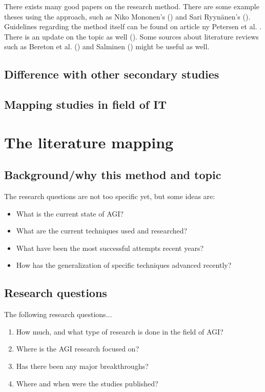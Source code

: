 \documentclass[utf8,english]{gradu3}
\begin{document}
There exists many good papers on the research method. There are some example theses using the approach, such as Niko Mononen's (\cite{mononen2018}) and Sari Ryynänen's (\cite{ryynanen2017}). Guidelines regarding the method itself can be found on article ny Petersen et al. \cite*{petersen2008}. There is an update on the topic as well (\cite{petersen2015}). Some sources about literature reviews such as Bereton et al. (\cite*{brereton2007}) and Salminen (\cite*{salminen2011}) might be useful as well.

\section{Difference with other secondary studies}

\section{Mapping studies in field of IT}

\chapter{The literature mapping}

\section{Background/why this method and topic}
The research questions are not too specific yet, but some ideas are:
\begin{itemize}
    \item What is the current state of AGI?
    \item What are the current techniques used and researched?
    \item What have been the most successful attempts recent years?
    \item How has the generalization of specific techniques advanced recently?
\end{itemize}

\section{Research questions}

The following research questions...


\begin{enumerate}
  \item How much, and what type of research is done in the field of AGI?
  \item Where is the AGI research focused on?
  \item Has there been any major breakthroughs?
  \item Where and when were the studies published?
\end{enumerate}
\end{document}
